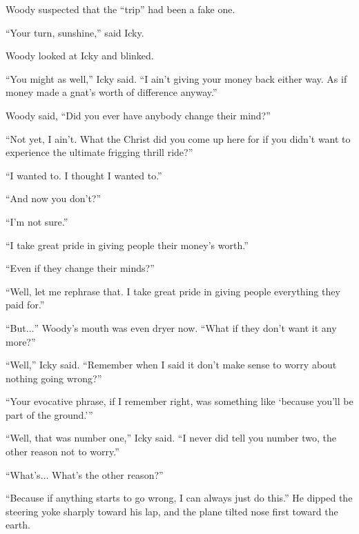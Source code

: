Woody suspected that the ``trip'' had been a fake one.

``Your turn, sunshine,'' said Icky.

Woody looked at Icky and blinked.

``You might as well,'' Icky said. ``I ain't giving your money back either way. As if money made a gnat's worth of difference anyway.''

Woody said, ``Did you ever have anybody change their mind?''

``Not yet, I ain't. What the Christ did you come up here for if you didn't want to experience the ultimate frigging thrill ride?''

``I wanted to. I thought I wanted to.''

``And now you don't?''

``I'm not sure.''

``I take great pride in giving people their money's worth.''

``Even if they change their minds?''

``Well, let me rephrase that. I take great pride in giving people everything they paid for.''

``But$\ldots$'' Woody's mouth was even dryer now. ``What if they don't want it any more?''

``Well,'' Icky said. ``Remember when I said it don't make sense to worry about nothing going wrong?''

``Your evocative phrase, if I remember right, was something like `because you'll be part of the ground.'\thinspace''

``Well, that was number one,'' Icky said. ``I never did tell you number two, the other reason not to worry.''

``What's$\ldots$ What's the other reason?''

``Because if anything starts to go wrong, I can always just do this.'' He dipped the steering yoke sharply toward his lap, and the plane tilted nose first toward the earth.
